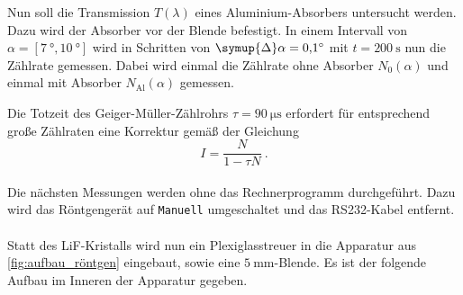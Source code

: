     Nun soll die Transmission $T(\lambda)$ eines Aluminium-Absorbers untersucht werden.
    Dazu wird der Absorber vor der Blende befestigt.
    In einem Intervall von $\alpha = [\SI{7}{\degree}, \SI{10}{\degree}]$ wird in Schritten von $\symup{\Delta}\alpha = \SI{0.1}{\degree}$ mit $t = \SI{200}{\second}$ nun die Zählrate gemessen.
    Dabei wird einmal die Zählrate ohne Absorber $N_0(\alpha)$
    und einmal mit Absorber $N_\text{Al}(\alpha)$ gemessen.

    Die Totzeit des Geiger-Müller-Zählrohrs $\tau = \SI{90}{\micro\second}$
    erfordert für entsprechend große Zählraten eine Korrektur gemäß der Gleichung
    \begin{equation}
        I = \frac{N}{1 - \tau N} \ .
        \label{eqn:totzeitkorrektur}
    \end{equation}
    \\
    Die nächsten Messungen werden ohne das Rechnerprogramm durchgeführt.
    Dazu wird das Röntgengerät auf \texttt{Manuell} umgeschaltet und das RS232-Kabel entfernt.\\
    \\
    Statt des LiF-Kristalls wird nun ein Plexiglasstreuer in die Apparatur aus \autoref{fig:aufbau_röntgen} eingebaut,
    sowie eine $\SI{5}{\milli\meter}$-Blende.
    Es ist der folgende Aufbau im Inneren der Apparatur gegeben.

